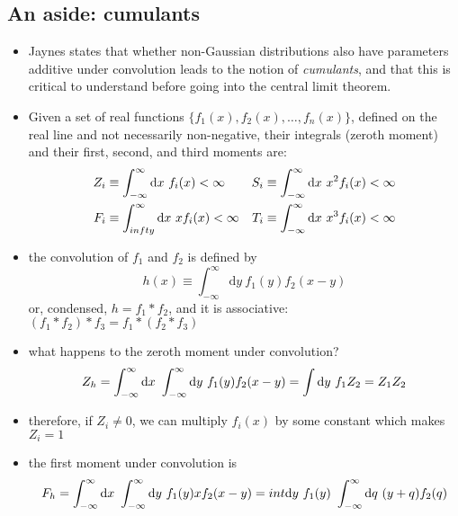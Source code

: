 \documentclass[../jaynes_prob_theory_notes.tex]{subfiles}
\begin{document}
        \subsection{An aside: cumulants}
            \begin{itemize}
                \item Jaynes states that whether non-Gaussian distributions also have parameters additive under convolution leads to the notion of \textit{cumulants}, and that this is critical to understand before going into the central limit theorem.
                \item Given a set of real functions $\{f_{1}(x), f_{2}(x), \ldots, f_{n}(x)\}$, defined on the real line and not necessarily non-negative, their integrals (zeroth moment) and their first, second, and third moments are:
                    \begin{align*}
                        Z_i &\equiv \int^{\infty}_{-\infty} \mathrm{d}x~f_{i}(x) < \infty & S_i &\equiv \int^{\infty}_{-\infty} \mathrm{d}x~x^{2}f_{i}(x) < \infty \\
                        F_i &\equiv \int^{\infty}_{\-infty} \mathrm{d}x~xf_{i}(x) < \infty & T_i &\equiv \int^{\infty}_{-\infty} \mathrm{d}x~x^{3}f_{i}(x) < \infty
                    \end{align*}
                \item the convolution of $f_1$ and $f_2$ is defined by
                    \begin{equation*}
                        h(x) \equiv \int^{\infty}_{-\infty}\mathrm{d}y~f_{1}(y) f_{2}(x-y)
                    \end{equation*}
                    or, condensed, $h = f_1 * f_2$, and it is associative: $(f_1 * f_2) * f_3 = f_1 * (f_2 * f_3)$
                \item what happens to the zeroth moment under convolution?
                    \begin{equation*}
                        Z_h = \int^{\infty}_{-\infty} \mathrm{d}x~\int^{\infty}_{-\infty} \mathrm{d}y~f_{1}(y)f_{2}(x-y) = \int \mathrm{d}y~f_{1}Z_2 = Z_{1}Z_{2}
                    \end{equation*}
                \item therefore, if $Z_i \neq 0$, we can multiply $f_{i}(x)$ by some constant which makes $Z_i = 1$
                \item the first moment under convolution is
                    \begin{align*}
                        F_h &= \infint \mathrm{d}x~\infint \mathrm{d}y~f_{1}(y)xf_{2}(x-y) = int \mathrm{d}y~f_{1}(y)~\infint \mathrm{d}q~(y+q)f_{2}(q) \\

\end{align*}
\end{itemize}
\end{document}

